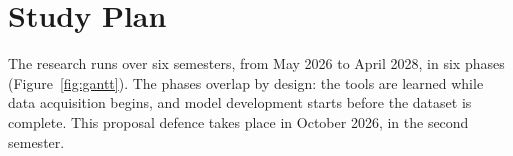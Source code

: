 \section{Study Plan}
\label{sec:study-plan}

The research runs over six semesters, from May 2026 to April 2028, in six
phases (Figure~\ref{fig:gantt}). The phases overlap by design: the tools are
learned while data acquisition begins, and model development starts before the
dataset is complete. This proposal defence takes place in October 2026, in the
second semester.


